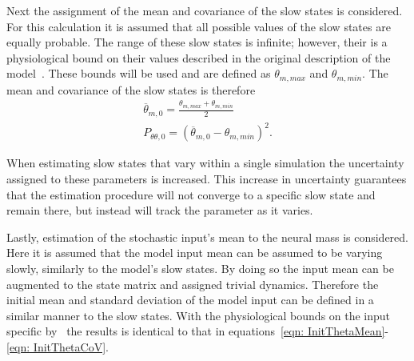Next the assignment of the mean and covariance of the slow states is considered. For this calculation it is assumed that all possible values of the slow states are equally probable. The range of these slow states is infinite; however, their is a physiological bound on their values described in the original description of the model~\citep{wendling2002epileptic}. These bounds will be used and are defined as $\theta_{m,max}$ and $\theta_{m,min}$. The mean and covariance of the slow states is therefore\begin{align}
\label{eqn: InitThetaMean}
\overline{\theta}_{m,0} = \frac{\theta_{m,max}+\theta_{m,min}}{2}\\
\label{eqn: InitThetaCoV}
P_{\theta\theta,0} = (\overline{\theta}_{m,0}-\theta_{m,min})^2.
\end{align}


When estimating slow states that vary within a single simulation the uncertainty assigned to these parameters is increased. This increase in uncertainty guarantees that the estimation procedure will not converge to a specific slow state and remain there, but instead will track the parameter as it varies. 

Lastly, estimation of the stochastic input's mean to the neural mass is considered. Here it is assumed that the model input mean can be assumed to be varying slowly, similarly to the model's slow states. By doing so the input mean can be augmented to the state matrix and assigned trivial dynamics. Therefore the initial mean and standard deviation of the model input can be defined in a similar manner to the slow states. With the physiological bounds on the input specific by~\cite{wendling2002epileptic} the results is identical to that in equations~\ref{eqn: InitThetaMean}-\ref{eqn: InitThetaCoV}. 

